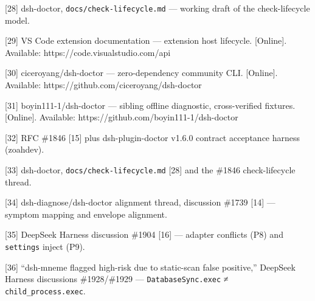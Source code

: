 \documentclass[
]{article}
\begin{document}
{[}28{]} dsh-doctor, \texttt{docs/check-lifecycle.md} --- working draft
of the check-lifecycle model.

{[}29{]} VS Code extension documentation --- extension host lifecycle.
{[}Online{]}. Available: https://code.visualstudio.com/api

{[}30{]} ciceroyang/dsh-doctor --- zero-dependency community CLI.
{[}Online{]}. Available: https://github.com/ciceroyang/dsh-doctor

{[}31{]} boyin111-1/dsh-doctor --- sibling offline diagnostic,
cross-verified fixtures. {[}Online{]}. Available:
https://github.com/boyin111-1/dsh-doctor

{[}32{]} RFC \#1846 {[}15{]} plus dsh-plugin-doctor v1.6.0 contract
acceptance harness (zoahdev).

{[}33{]} dsh-doctor, \texttt{docs/check-lifecycle.md} {[}28{]} and the
\#1846 check-lifecycle thread.

{[}34{]} dsh-diagnose/dsh-doctor alignment thread, discussion \#1739
{[}14{]} --- symptom mapping and envelope alignment.

{[}35{]} DeepSeek Harness discussion \#1904 {[}16{]} --- adapter
conflicts (P8) and \texttt{settings} inject (P9).

{[}36{]} ``dsh-mneme flagged high-risk due to static-scan false
positive,'' DeepSeek Harness discussions \#1928/\#1929 ---
\texttt{DatabaseSync.exec} ≠ \texttt{child\_process.exec}.
\end{document}
